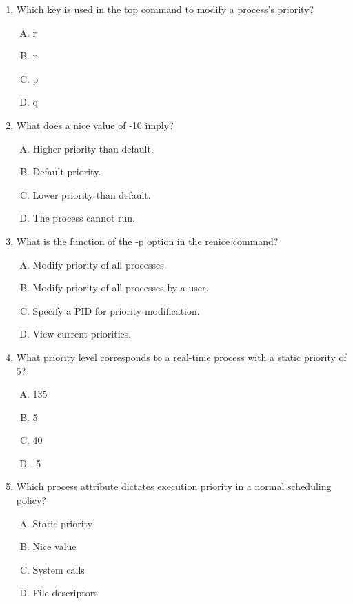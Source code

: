\documentclass[a4paper]{report}
\begin{document}
\begin{enumerate}[1.]
    \item Which key is used in the top command to modify a process's priority?  
    \begin{enumerate}[A)]
        \item r  
        \item n  
        \item p  
        \item q  
    \end{enumerate}

    \item What does a nice value of -10 imply?  
    \begin{enumerate}[A)]
        \item Higher priority than default.  
        \item Default priority.  
        \item Lower priority than default.  
        \item The process cannot run.  
    \end{enumerate}

    \item What is the function of the -p option in the renice command?  
    \begin{enumerate}[A)]
        \item Modify priority of all processes.  
        \item Modify priority of all processes by a user.  
        \item Specify a PID for priority modification.  
        \item View current priorities.  
    \end{enumerate}

    \item What priority level corresponds to a real-time process with a static priority of 5?  
    \begin{enumerate}[A)]
        \item 135  
        \item 5  
        \item 40  
        \item -5  
    \end{enumerate}

    \item Which process attribute dictates execution priority in a normal scheduling policy?  
    \begin{enumerate}[A)]
        \item Static priority  
        \item Nice value  
        \item System calls  
        \item File descriptors  
    \end{enumerate}


\end{enumerate}
\end{document}
